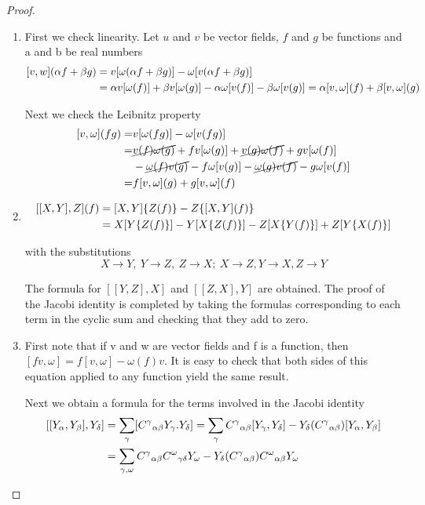 \begin{proof}\leavevmode\let\qed\relax
\begin{enumerate}[label=(\alph*)]
    \item First we check linearity. Let $u$ and $v$ be vector fields, $f$ and $g$ be functions and a and b be real numbers
    \[\begin{aligned}\relax
        [v,w](\alpha f+\beta g)&=v[\omega(\alpha f+\beta g)]-\omega[v(\alpha f+\beta g)]\\
        &=\alpha v[\omega(f)]+\beta v[\omega(g)]-\alpha\omega[v(f)]-\beta\omega[v(g)]=\alpha[v,\omega](f)+\beta[v,\omega](g)
    \end{aligned}\]

    Next we check the Leibnitz property
    \[\begin{aligned}\relax
        [v,\omega](fg)=&v[\omega(fg)]-\omega[v(fg)]\\
        =&\cancel{v(f)\omega(g)}+fv[\omega(g)]+\cancel{v(g)\omega(f)}+gv[\omega(f)]\\
        &-\cancel{\omega(f)v(g)}-f\omega[v(g)]-\cancel{\omega(g)v(f)}-g\omega[v(f)]\\
        =&f[v,\omega](g)+g[v,\omega](f)
    \end{aligned}
    \]
    \item \[\begin{aligned}\relax
        [[X,Y],Z](f)&=[X,Y]\{Z(f)\}-Z\{[X,Y](f)\}\\
        &=X[Y\{Z(f)\}]-Y[X\{Z(f)\}]-Z[X\{Y(f)\}]+Z[Y\{X(f)\}]
    \end{aligned}\]

    with the substitutions 
    \[X\to Y,\ Y\to Z,\ Z\to X;\ X\to Z, Y\to X, Z\to Y\]

    The formula for $[[Y,Z],X]$ and $[[Z, X], Y]$ are obtained. The proof of the Jacobi identity is completed by taking the formulas corresponding to each term in the cyclic sum and checking that they add to zero.
    \item First note that if v and w are vector fields and f is a function, then $[fv,\omega]=f[v,\omega]-\omega(f)v$. It is easy to check that both sides of this equation
    applied to any function yield the same result.
    
    Next we obtain a formula for the terms involved in the Jacobi identity
    \[\begin{aligned}\relax
        [[Y_\alpha,Y_\beta],Y_\delta]&=\sum_\gamma[{C^\gamma}_{\alpha\beta}Y_\gamma.Y_\delta]=\sum_\gamma {C^\gamma}_{\alpha\beta}[Y_\gamma,Y_\delta]-Y_\delta({C^\gamma}_{\alpha\beta})[Y_\alpha,Y_\beta]\\
        &=\sum_{\gamma,\omega}{C^\gamma}_{\alpha\beta}{C^\omega}_{\gamma\delta}Y_\omega-Y_\delta({C^\gamma}_{\alpha\beta}){C^\omega}_{\alpha\beta}Y_\omega
    \end{aligned}\]


\end{enumerate}
\end{proof}
